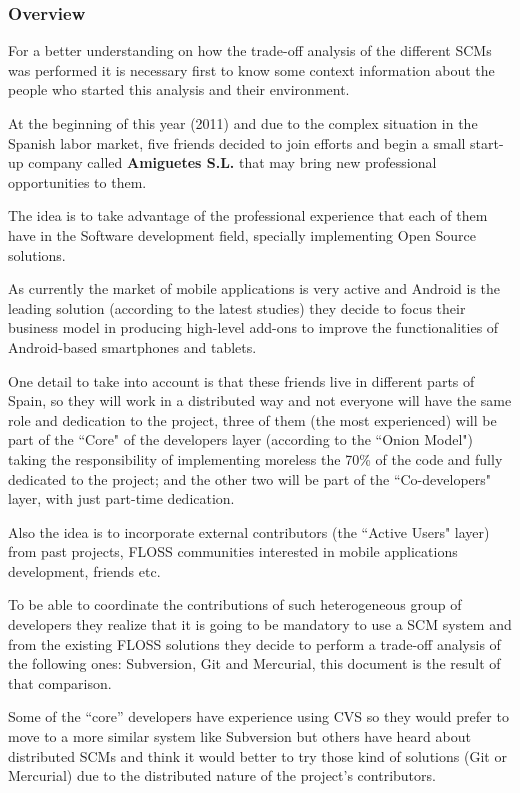\documentclass[a4paper,10pt]{article}
\begin{document}
\subsubsection{Overview}

For a better understanding on how the trade-off analysis of the different SCMs
was performed it is necessary first to know some context information about the
people who started this analysis and their environment.

At the beginning of this year (2011) and due to the complex situation in the
Spanish labor market, five friends decided to join efforts and begin a small
start-up company called \textbf{Amiguetes S.L.} that may bring new professional
opportunities to them.

The idea is to take advantage of the professional experience that each of them
have in the Software development field, specially implementing Open Source
solutions.

As currently the market of mobile applications is very active and
Android\cite{Android} is the leading solution (according to the latest
studies\cite{Smartphone}) they decide to focus their business model in producing
high-level add-ons to improve the functionalities of Android-based smartphones
and tablets.

One detail to take into account is that these friends live in different parts of
Spain, so they will work in a distributed way and not everyone will have the
same role and dedication to the project, three of them (the most experienced)
will be part of the ``Core" of the developers layer (according to the ``Onion
Model"\cite{Onion}) taking the responsibility of implementing moreless the 70\%
of the code and fully dedicated to the project; and the other two will be part
of the ``Co-developers" layer, with just part-time dedication.

Also the idea is to incorporate external contributors (the ``Active Users"
layer) from past projects, FLOSS communities interested in mobile applications
development, friends etc.

To be able to coordinate the contributions of such heterogeneous group of
developers they realize that it is going to be mandatory to use a SCM\cite{SCM}
system and from the existing FLOSS solutions they decide to perform a trade-off
analysis of the following ones: Subversion\cite{Subversion}, Git\cite{Git} and
Mercurial\cite{Mercurial}, this document is the result of that comparison.

Some of the ``core'' developers have experience using CVS\cite{CVS} so they
would
prefer to move to a more similar system like Subversion but others have heard
about distributed SCMs and think it would better to try those kind of solutions
(Git or Mercurial) due to the distributed nature of the project's contributors.
\end{document}
